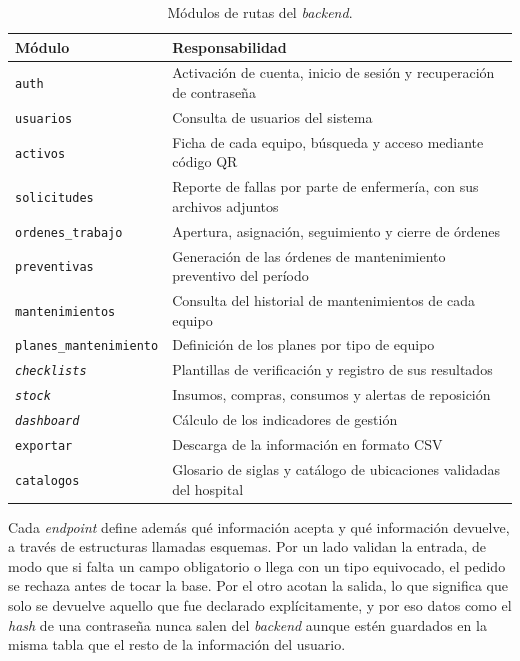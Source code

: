 \documentclass[10pt]{article}
\begin{document}
\begin{table}[H]
    \caption{Módulos de rutas del \textit{backend}.}
    \label{tab:backend}
    \centering
    \begin{tabular}{>{\raggedright\arraybackslash}p{4.2cm} >{\raggedright\arraybackslash}p{\dimexpr\linewidth-4.2cm-2\tabcolsep\relax}}
        \toprule
        \textbf{Módulo} & \textbf{Responsabilidad} \\
        \midrule
        \texttt{auth} & Activación de cuenta, inicio de sesión y recuperación de contraseña \\
        \texttt{usuarios} & Consulta de usuarios del sistema \\
        \texttt{activos} & Ficha de cada equipo, búsqueda y acceso mediante código QR \\
        \texttt{solicitudes} & Reporte de fallas por parte de enfermería, con sus archivos adjuntos \\
        \texttt{ordenes\_trabajo} & Apertura, asignación, seguimiento y cierre de órdenes \\
        \texttt{preventivas} & Generación de las órdenes de mantenimiento preventivo del período \\
        \texttt{mantenimientos} & Consulta del historial de mantenimientos de cada equipo \\
        \texttt{planes\_mantenimiento} & Definición de los planes por tipo de equipo \\
        \texttt{\textit{checklists}} & Plantillas de verificación y registro de sus resultados \\
        \texttt{\textit{stock}} & Insumos, compras, consumos y alertas de reposición \\
        \texttt{\textit{dashboard}} & Cálculo de los indicadores de gestión \\
        \texttt{exportar} & Descarga de la información en formato CSV \\
        \texttt{catalogos} & Glosario de siglas y catálogo de ubicaciones validadas del hospital \\
        \bottomrule
    \end{tabular}
\end{table}
Cada \textit{endpoint} define además qué información acepta y qué información devuelve, a través de estructuras llamadas esquemas. Por un lado validan la entrada, de modo que si falta un campo obligatorio o llega con un tipo equivocado, el pedido se rechaza antes de tocar la base. Por el otro acotan la salida, lo que significa que solo se devuelve aquello que fue declarado explícitamente, y por eso datos como el \textit{hash} de una contraseña nunca salen del \textit{backend} aunque estén guardados en la misma tabla que el resto de la información del usuario.
\end{document}
